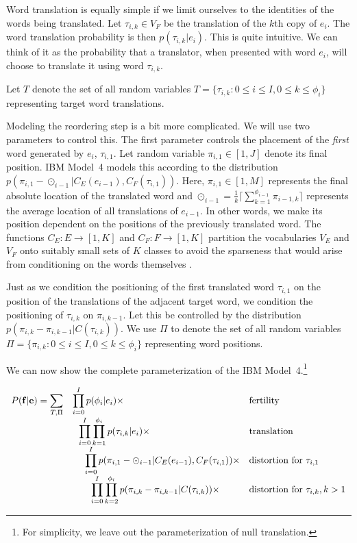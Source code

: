 Word translation is equally simple if we limit ourselves to the identities of
the words being translated.  Let  $\tau_{i,k} \in V_F$ be the translation
of the $k$th copy of $e_i$.  The word translation probability is then
$p(\tau_{i,k}|e_i)$.  This is quite intuitive.  We can think of it
as the probability that a translator, when presented with word $e_i$, 
will choose to translate it using word $\tau_{i,k}$.

Let $T$ denote the set of all random variables 
$T = \{\tau_{i,k}:0 \leq i \leq I, 0 \leq k \leq \phi_i\}$ representing 
target word translations.

Modeling the reordering step is a bit more complicated.  We will
use two parameters to control this.  The first parameter controls
the placement of the {\em first} word generated by $e_i$, $\tau_{i,1}$.
Let random variable $\pi_{i,1}\in [1,J]$ denote its final position.
IBM Model~4 models this
according to the distribution $p(\pi_{i,1}-\odot_{i-1}|C_E(e_{i-1}),C_F(\tau_{i,1}))$.
Here, $\pi_{i,1} \in [1,M]$ represents the final absolute location of the translated
word and $\odot_{i-1} = \frac{1}{k} \lceil \sum_{k=1}^{\phi_{i-1}} \pi_{i-1,k} \rceil$ 
represents the average location of all translations of
$e_{i-1}$.  In other words, we make its position dependent on the positions
of the previously translated word.  The functions $C_E : E \rightarrow [1,K]$ 
and $C_F : F \rightarrow [1,K]$ partition the vocabularies $V_E$ and $V_F$ onto suitably
small sets of $K$ classes to avoid the sparseness that would arise from conditioning
on the words themselves \citep{Brown:1992:cl,Och:1999:eacl}.

Just as we condition the positioning of the first translated word $\tau_{i,1}$
on the position of the translations of the adjacent target word, we condition
the positioning of $\tau_{i,k}$ on $\pi_{i,k-1}$.  Let this be controlled by the distribution  $p(\pi_{i,k}-\pi_{i,k-1}|C(\tau_{i,k}))$. 
We use $\Pi$ to denote the set of all random variables 
$\Pi = \{\pi_{i,k}:0 \leq i \leq I, 0 \leq k \leq \phi_i\}$ representing word positions.

We can now show the complete parameterization of the IBM Model~4.\footnote{For
simplicity, we leave out the parameterization of null translation.}

\begin{equation} \label{eq:models45} 
\begin{array}{lll}
\displaystyle P({\bf f}|{\bf e}) = \sum_{T,\Pi} & \displaystyle \prod_{i=0}^I p(\phi_i|e_i) \times & {\rm fertility} \\
 \nonumber               & \displaystyle ~~\prod_{i=0}^I \prod_{k=1}^{\phi_i} p(\tau_{i,k}|e_i) \times & {\rm translation}\\
 \nonumber               & \displaystyle ~~~~\prod_{i=0}^I p(\pi_{i,1}-\odot_{i-1}|C_E(e_{i-1}),C_F(\tau_{i,1})) \times & {\rm distortion~for~}\tau_{i,1}\\
 \nonumber               & \displaystyle ~~~~~~\prod_{i=0}^I\prod_{k=2}^{\phi_i} p(\pi_{i,k}-\pi_{i,k-1}|C(\tau_{i,k})) \times & {\rm distortion~for~}\tau_{i,k}, k>1\\
\end{array}
\end{equation}

